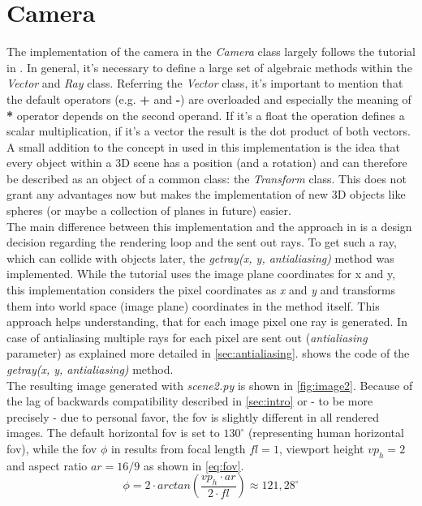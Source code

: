 \documentclass[]{article}
\begin{document}
	\section{Camera}
	\label{sec:camera}
	The implementation of the camera in the \emph{Camera} class largely follows the tutorial in \cite{Shirley2020RTW1}. In general, it’s necessary to define a large set of algebraic methods within the \emph{Vector} and \emph{Ray} class. Referring the \emph{Vector} class, it’s important to mention that the default operators (e.g. \textbf{+} and \textbf{-}) are overloaded and especially the meaning of \textbf{*} operator depends on the second operand. If it’s a float the operation defines a scalar multiplication, if it’s a vector the result is the dot product of both vectors.
	\\
	A small addition to the concept in \cite{Shirley2020RTW1} used in this implementation is the idea that every object within a 3D scene has a position (and a rotation) and can therefore be described as an object of a common class: the \emph{Transform} class. This does not grant any advantages now but makes the implementation of new 3D objects like spheres (or maybe a collection of planes in future) easier.
	\\
	The main difference between this implementation and the approach in \cite{Shirley2020RTW1} is a design decision regarding the rendering loop and the sent out rays. To get such a ray, which can collide with objects later, the \emph{get\textunderscore ray(x, y, antialiasing)} method was implemented. While the tutorial uses the image plane coordinates for x and y, this implementation considers the pixel coordinates as \emph{x} and \emph{y} and transforms them into world space (image plane) coordinates in the method itself. This approach helps understanding, that for each image pixel one ray is generated. In case of antialiasing multiple rays for each pixel are sent out (\emph{antialiasing} parameter) as explained more detailed in \cref{sec:antialiasing}.  shows the code of the \emph{get\textunderscore ray(x, y, antialiasing)} method.
	\\
	The resulting image generated with \emph{scene2.py} is shown in \cref{fig:image2}. Because of the lag of backwards compatibility described in \cref{sec:intro} or - to be more precisely - due to personal favor, the \ac{fov} is slightly different in all rendered images. The default horizontal \ac{fov} is set to $130^{\circ}$ (representing human horizontal \ac{fov}), while the \ac{fov} $\phi$ in \cite{Shirley2020RTW1} results from focal length $fl=1$, viewport height $vp_h=2$ and aspect ratio $ar=\label{key}16/9$ as shown in \cref{eq:fov}.
	\begin{equation}
		\label{eq:fov}
		\phi = 2\cdot arctan\left(\frac{vp_h\cdot ar}{2\cdot fl}\right) \approx 121,28^{\circ}
	\end{equation}
\end{document}
